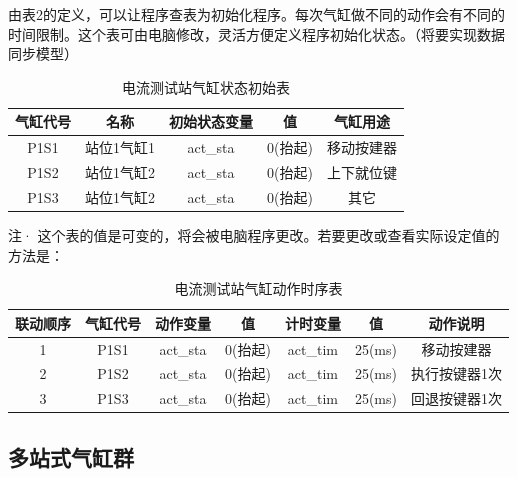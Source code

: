 \documentclass[utf8]{ctexart}
\begin{document}
由表2的定义，可以让程序查表为初始化程序。每次气缸做不同的动作会有不同的时间限制。这个表可由电脑修改，灵活方便定义程序初始化状态。（将要实现数据同步模型）

\begin{table}[!htbp]
	\centering
	\begin{tabular}{c|c|cc|c}
		\toprule
		气缸代号&名称&初始状态变量&值&气缸用途 \\ \hline
		P1S1&站位1气缸1&act\_sta&0(抬起)&移动按建器 \\
		P1S2&站位1气缸2&act\_sta&0(抬起)&上下就位键 \\
		P1S3&站位1气缸2&act\_sta&0(抬起)&其它 \\
		\bottomrule
	\end{tabular}
	\caption{电流测试站气缸状态初始表}
\end{table} 
注· 这个表的值是可变的，将会被电脑程序更改。若要更改或查看实际设定值的方法是：~~~~

\begin{table}[!htbp]
	\centering
	\begin{tabular}{c|c|cc|cc|c}
		\toprule
		联动顺序&气缸代号&动作变量&值&计时变量&值&动作说明 \\ \hline
		1&P1S1&act\_sta&0(抬起)&act\_tim&25(ms)&移动按建器 \\
		2&P1S2&act\_sta&0(抬起)&act\_tim&25(ms)&执行按键器1次 \\
		3&P1S3&act\_sta&0(抬起)&act\_tim&25(ms)&回退按键器1次 \\
		\bottomrule
	\end{tabular}
	\caption{电流测试站气缸动作时序表}
\end{table} 


\subsection{多站式气缸群}
\end{document}
